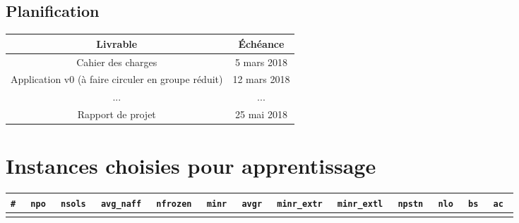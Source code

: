 \documentclass[a4paper, 11pt, titlepage]{article}
\begin{document}
\begin{appendix}
\subsection{Planification}
\begin{center}
		\begin{tabular}{|c|c|}
			\hline
			\textbf{Livrable} & \textbf{Échéance} \\
			\hline
			Cahier des charges & 5 mars 2018 \\
			Application v0 (à faire circuler en groupe réduit) & 12 mars 2018 \\
			... & ... \\
			Rapport de projet & 25 mai 2018 \\
			\hline
			
		\end{tabular}
	\end{center}
	\newpage
	\section{Instances choisies pour apprentissage}
	\label{tab-trainset}
	\begin{table}[ht!]
		\centering
    	\small
	\begin{adjustbox}{angle=90}
	\begin{tabular}{|ccccccccccccc|}
    	\hline
    	\tt \# & \tt npo & \tt nsols & \tt avg\_naff & \tt nfrozen & \tt minr & \tt avgr & \tt minr\_extr & \tt minr\_extl & \tt npstn & \tt nlo & \tt bs & \tt ac
        \\\hline
	    \csvreader[head to column names]{inst.csv}{}
	    {\id & \npo & \nsols & \avgnaff & \nfrozen & \minr & \avgr & \minrextr & \minrextl & \npstn & \nlo & \bs & \ac\\}
	\end{tabular}
	\end{adjustbox}
	\end{table}
\end{appendix}
\end{document}
